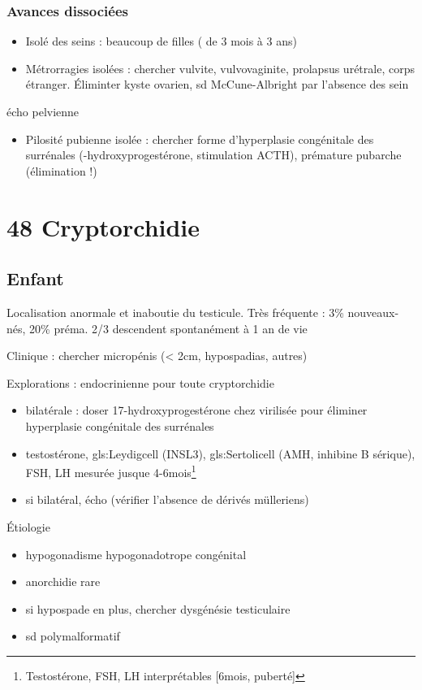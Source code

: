 \documentclass{book}
\begin{document}
\subsubsection{Avances dissociées}
\label{sec:orgf615c00}
\begin{itemize}
\item Isolé des seins : beaucoup de filles ( de 3 mois à 3 ans)
\item Métrorragies isolées : chercher vulvite, vulvovaginite, prolapsus urétrale,
corps étranger. Éliminter kyste ovarien, sd McCune-Albright par l'absence des
sein
\end{itemize}
\thus écho pelvienne
\begin{itemize}
\item Pilosité pubienne isolée : chercher forme d'hyperplasie congénitale des
surrénales (-hydroxyprogestérone, stimulation ACTH), prémature pubarche
(élimination !)
\end{itemize}

\section{48 \textdagger{} Cryptorchidie}
\label{sec:org10385b8}
\subsection{Enfant}
\label{sec:org38a0030}
Localisation anormale et inaboutie du testicule. Très fréquente : 3\%
nouveaux-nés, 20\% préma. 2/3 descendent spontanément à 1 an de vie

Clinique : chercher micropénis (< 2cm, hypospadias, autres)

Explorations : endocrinienne pour toute cryptorchidie \danger
\begin{itemize}
\item bilatérale : doser 17-hydroxyprogestérone chez \female{} virilisée pour éliminer hyperplasie
congénitale des surrénales
\item testostérone, gls:Leydigcell (INSL3), gls:Sertolicell (AMH, inhibine B sérique), FSH, LH mesurée jusque 4-6mois\footnote{\danger Testostérone, FSH, LH interprétables [6mois, puberté]}
\item si bilatéral, écho (vérifier l'absence de dérivés mülleriens)
\end{itemize}

Étiologie
\begin{itemize}
\item hypogonadisme hypogonadotrope congénital
\item anorchidie rare
\item si hypospade en plus, chercher dysgénésie testiculaire
\item sd polymalformatif
\end{itemize}
\end{document}
